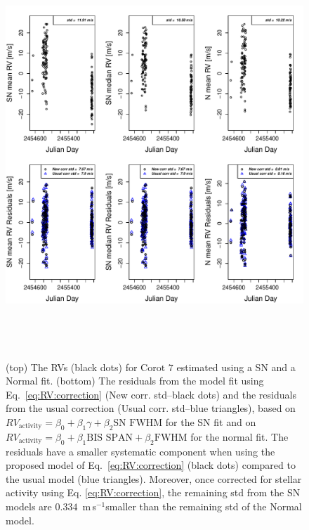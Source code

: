 \documentclass{aa}
\def\ms{\hbox{\,m\,s$^{-1}$}}         %
\begin{document}
\begin{figure} 
\begin{center}
\includegraphics[height = 6in]{NEW_CORRECTIONLRa01_E_[3]CorrectionActivity_RadialVelocity_vs_time.pdf} 
   \caption{(top) The RVs (black dots) for $\text{Corot }7$ estimated using a SN and a Normal fit.
 (bottom) The residuals from the model fit using Eq.~\ref{eq:RV:correction} (New corr. std--black dots) and the residuals from the usual correction (Usual corr. std--blue triangles), based on $RV_{\text{activity}}=\beta_0+\beta_1 \gamma + \beta_2 \text{SN FWHM}$ for the SN fit and on $RV_{\text{activity}}=\beta_0+\beta_1 \text{BIS SPAN} + \beta_2 \text{FWHM}$ for the normal fit. The residuals have a smaller systematic component when using the proposed model of Eq.~\ref{eq:RV:correction} (black dots) compared to the usual model (blue triangles). Moreover, once corrected for stellar activity using Eq. \ref{eq:RV:correction}, the remaining std from the SN models are $0.334$ \ms smaller than the remaining std of the Normal model.}
   \label{fig:Corot-7:correctionRV}
\end{center}
\end{figure}
\end{document}
